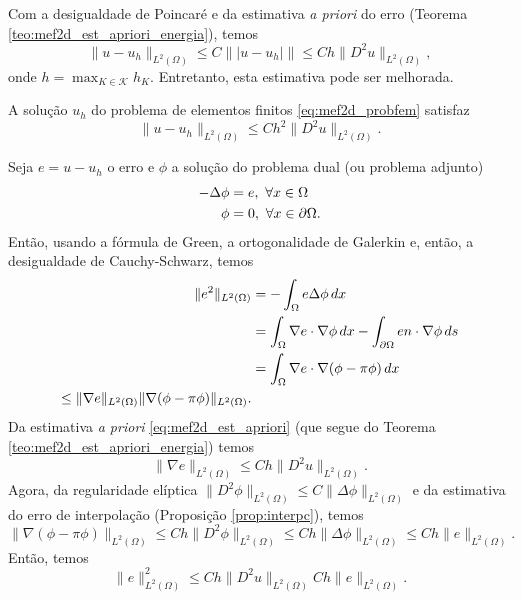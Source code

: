 Com a desigualdade de Poincaré e da estimativa {\it a priori} do erro (Teorema \ref{teo:mef2d_est_apriori_energia}), temos
\begin{equation}\label{eq:mef2d_est_apriori}
  \|u-u_h\|_{L^2(\Omega)} \leq C \||u-u_h|\| \leq Ch\|D^2u\|_{L^2(\Omega)},
\end{equation}
onde $h = \max_{K\in\mathcal{K}} h_K$. Entretanto, esta estimativa pode ser melhorada.

\begin{teo}
  A solução $u_h$ do problema de elementos finitos \eqref{eq:mef2d_probfem} satisfaz
  \begin{equation}
    \|u-u_h\|_{L^2(\Omega)} \leq Ch^2\|D^2u\|_{L^2(\Omega)}.
  \end{equation}
\end{teo}
\begin{dem}
  Seja $e = u-u_h$ o erro e $\phi$ a solução do problema dual (ou problema adjunto)
  \begin{align}
    -\Delta \phi &= e,~\forall x\in\Omega\\
    \phi &= 0,~\forall x\in\partial\Omega.
  \end{align}
Então, usando a fórmula de Green, a ortogonalidade de Galerkin e, então, a desigualdade de Cauchy-Schwarz, temos
\begin{align}
  \|e^2\|_{L^2(\Omega)} &= -\int_\Omega e\Delta\phi\,dx\\
  &=\int_\Omega \nabla e\cdot\nabla\phi\,dx - \int_{\partial\Omega} en\cdot\nabla \phi\,ds\\
  &=\int_\Omega \nabla e\cdot\nabla(\phi-\pi\phi)\,dx\\
  \leq\|\nabla e\|_{L^2(\Omega)}\|\nabla(\phi-\pi\phi)\|_{L^2(\Omega)}.
\end{align}
Da estimativa {\it a priori} \eqref{eq:mef2d_est_apriori} (que segue do Teorema \ref{teo:mef2d_est_apriori_energia}) temos
\begin{equation}
  \|\nabla e\|_{L^2(\Omega)} \leq Ch\|D^2u\|_{L^2(\Omega)}.
\end{equation}
Agora, da regularidade elíptica $\|D^2\phi\|_{L^2(\Omega)} \leq C\|\Delta\phi\|_{L^2(\Omega)}$ \cite{Evans1998a} e da estimativa do erro de interpolação (Proposição \ref{prop:interpc}), temos
\begin{equation}
  \|\nabla(\phi-\pi\phi)\|_{L^2(\Omega)} \leq Ch\|D^2\phi\|_{L^2(\Omega)}\leq Ch\|\Delta\phi\|_{L^2(\Omega)} \leq Ch\|e\|_{L^2(\Omega)}.
\end{equation}
Então, temos
\begin{equation}
  \|e\|_{L^2(\Omega)}^2 \leq Ch\|D^2u\|_{L^2(\Omega)}Ch\|e\|_{L^2(\Omega)}.
\end{equation}
\end{dem}
